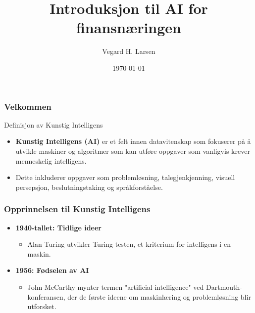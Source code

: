\documentclass[aspectratio=169]{beamer}
\title{Introduksjon til AI for finansnæringen}
\author{Vegard H. Larsen}
\institute{Førsteammanuensis, Institutt for datavitenskap og analyse, BI}
\date{\today}
\begin{document}
\frame{\titlepage}

\begin{frame}
    \frametitle{Velkommen}
\end{frame}

\begin{frame}{Definisjon av Kunstig Intelligens}
    \begin{itemize}
        \item \textbf{Kunstig Intelligens (AI)} er et felt innen datavitenskap som fokuserer på å utvikle maskiner og algoritmer som kan utføre oppgaver som vanligvis krever menneskelig intelligens.
        \item Dette inkluderer oppgaver som problemløsning, talegjenkjenning, visuell persepsjon, beslutningstaking og språkforståelse.
    \end{itemize}

\end{frame}

\begin{frame}
    \frametitle{Opprinnelsen til Kunstig Intelligens}

    \begin{itemize}
        \item \textbf{1940-tallet: Tidlige ideer}
              \begin{itemize}
                  \item Alan Turing utvikler Turing-testen, et kriterium for intelligens i en maskin.
              \end{itemize}

        \item \textbf{1956: Fødselen av AI}
              \begin{itemize}
                  \item John McCarthy mynter termen "artificial intelligence" ved Dartmouth-konferansen, der de første ideene om maskinlæring og problemløsning blir utforsket.
              \end{itemize}
    \end{itemize}

\end{frame}
\end{document}
